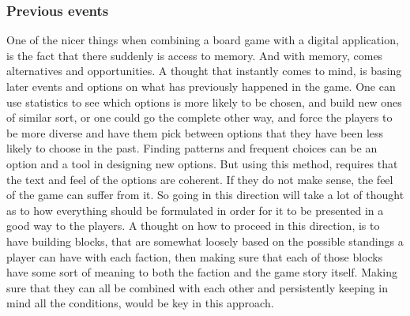 \subsubsection{Previous events}
One of the nicer things when combining a board game with a digital application, is the fact that there suddenly is access to memory. And with memory, comes alternatives and opportunities. A thought that instantly comes to mind, is basing later events and options on what has previously happened in the game. One can use statistics to see which options is more likely to be chosen, and build new ones of similar sort, or one could go the complete other way, and force the players to be more diverse and have them pick between options that they have been less likely to choose in the past. Finding patterns and frequent choices can be an option and a tool in designing new options. But using this method, requires that the text and feel of the options are coherent. If they do not make sense, the feel of the game can suffer from it. So going in this direction will take a lot of thought as to how everything should be formulated in order for it to be presented in a good way to the players. A thought on how to proceed in this direction, is to have building blocks, that are somewhat loosely based on the possible standings a player can have with each faction, then making sure that each of those blocks have some sort of meaning to both the faction and the game story itself. Making sure that they can all be combined with each other and persistently keeping in mind all the conditions, would be key in this approach.


